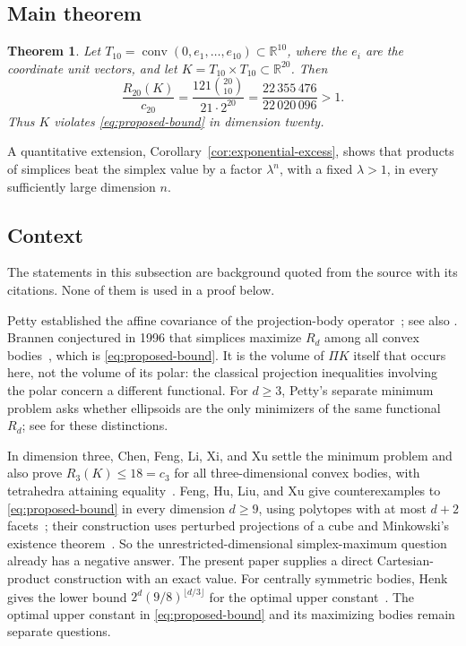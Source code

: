 \documentclass[11pt]{article}
\newtheorem{theorem}{Theorem}
\newcommand{\R}{\mathbb R}
\DeclareMathOperator{\conv}{conv}
\begin{document}
\subsection{Main theorem}

\begin{theorem}\label{thm:counterexample}
Let \(T_{10}=\conv(0,e_1,\ldots,e_{10})\subset\R^{10}\), where the
\(e_i\) are the coordinate unit vectors, and let
\(K=T_{10}\times T_{10}\subset\R^{20}\). Then
\[
 \frac{R_{20}(K)}{c_{20}}
 =\frac{121\binom{20}{10}}{21\cdot2^{20}}
 =\frac{22\,355\,476}{22\,020\,096}>1.
\]
Thus \(K\) violates \eqref{eq:proposed-bound} in dimension twenty.
\end{theorem}

A quantitative extension, Corollary~\ref{cor:exponential-excess}, shows
that products of simplices beat the simplex value by a factor
\(\lambda^n\), with a fixed \(\lambda>1\), in every sufficiently large
dimension \(n\).

\subsection{Context}

The statements in this subsection are background quoted from the source
with its citations. None of them is used in a proof below.

Petty established the affine covariance of the projection-body
operator~\cite{Petty}; see also \cite[Equation~(1)]{Ludwig}. Brannen
conjectured in 1996 that simplices maximize \(R_d\) among all convex
bodies~\cite{Brannen}, which is \eqref{eq:proposed-bound}. It is the
volume of \(\Pi K\) itself that occurs here, not the volume of its
polar: the classical projection inequalities involving the polar concern
a different functional. For \(d\ge3\), Petty's separate minimum problem
asks whether ellipsoids are the only minimizers of the same functional
\(R_d\); see \cite[Section~1]{Saroglou} for these distinctions.

In dimension three, Chen, Feng, Li, Xi, and Xu settle the minimum
problem and also prove \(R_3(K)\le18=c_3\) for all three-dimensional
convex bodies, with tetrahedra attaining
equality~\cite[Theorems~1.1 and~1.2]{ChenEtAl}. Feng, Hu, Liu, and Xu
give counterexamples to \eqref{eq:proposed-bound} in every dimension
\(d\ge9\), using polytopes with at most \(d+2\)
facets~\cite[Theorem~1.3]{FengEtAl}; their construction uses perturbed
projections of a cube and Minkowski's existence
theorem~\cite[Section~4]{FengEtAl}. So the unrestricted-dimensional
simplex-maximum question already has a negative answer. The present
paper supplies a direct Cartesian-product construction with an exact
value. For centrally symmetric bodies, Henk gives the lower bound
\(2^d(9/8)^{\lfloor d/3\rfloor}\) for the optimal upper
constant~\cite{Henk}. The optimal upper constant in
\eqref{eq:proposed-bound} and its maximizing bodies remain separate
questions.
\end{document}
